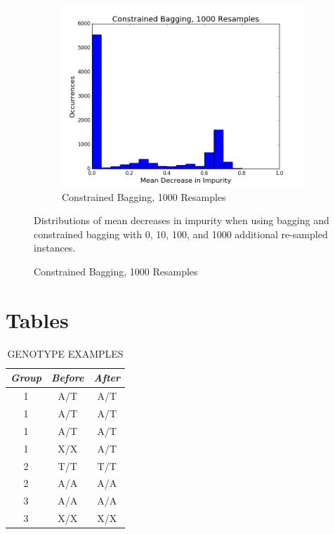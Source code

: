 \begin{figure}[H]
\begin{subfigure}[b]{0.45\textwidth}
    \includegraphics[width=\textwidth]{figures/random_forests/bagging_bias_constrained_bagging_hist_1000.png}
    \caption{Constrained Bagging, 1000 Resamples}
    \label{fig:bagging-bias-constrained-1000}
  \end{subfigure}

  Distributions of mean decreases in impurity when using bagging and constrained bagging with 0, 10, 100, and 1000 additional re-sampled instances.
  \label{fig:bagging-bias}
\end{figure}

\section{Tables}
\begin{table}[H]
  \begin{center}
    \small
    \caption{\label{tab:unknown-genotypes-example} GENOTYPE EXAMPLES}
    \begin{tabular}{ c c c}
      \hline
      \emph{Group} & \emph{Before} & \emph{After}\\ \hline
      1 & A/T & A/T \\
      1 & A/T & A/T \\
      1 & A/T & A/T \\
      1 & X/X & A/T \\
      2 & T/T & T/T \\
      2 & A/A & A/A \\
      3 & A/A & A/A \\
      3 & X/X & X/X \\
    \end{tabular}
  \end{center}
  
\end{table}

